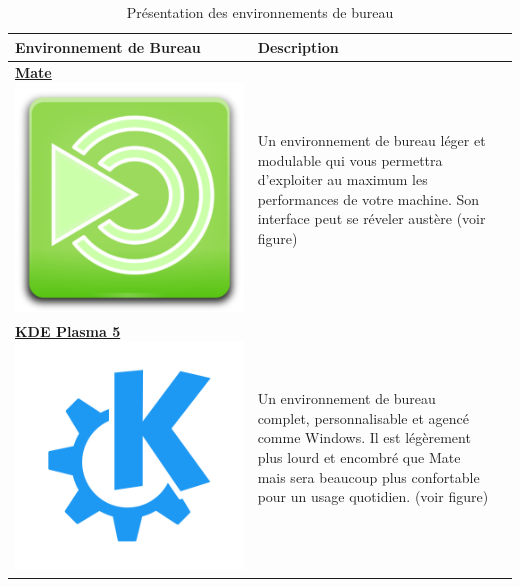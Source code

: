 \begin{table}[ht]
	\centering
	\begin{tabularx}{\textwidth}{|C|X|X|}
		\hline
		\textbf{Environnement de Bureau} & \textbf{Description} \\
		\hline
		\href{https://mate-desktop.org/fr/}{\textbf{Mate} \linebreak \vspace{5px} \centering \includegraphics[height=0.5\linewidth]{images/mate}} & Un environnement de bureau léger et modulable qui vous permettra d'exploiter au maximum les performances de votre machine. Son interface peut se réveler austère (voir figure) \\
		\hline
		\href{https://kde.org/fr/}{\textbf{KDE Plasma 5} \linebreak \vspace{5px} \centering \includegraphics[width=0.5\linewidth]{images/kdelogo}} & Un environnement de bureau complet, personnalisable et agencé comme Windows. Il est légèrement plus lourd et encombré que Mate mais sera beaucoup plus confortable pour un usage quotidien. (voir figure) \\
		\hline
	\end{tabularx}
	\caption{Présentation des environnements de bureau}
	\label{tab:desktop}
\end{table}

